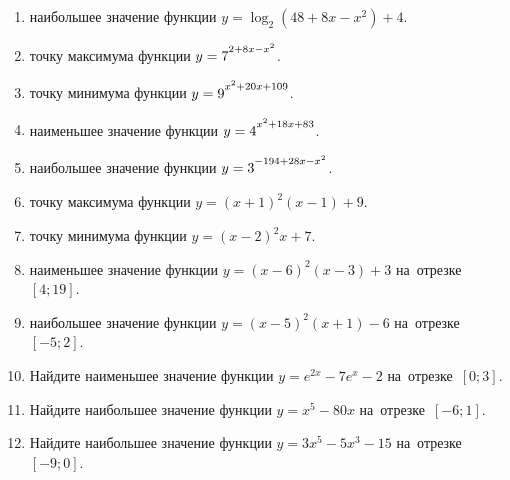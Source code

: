 \documentclass[a4paper,10pt]{article}
\begin{document}
\begin{enumerate}
\item {} наибольшее значение функции $y=\log_2\left(48+8x-x^2\right)+4$.

\item {} точку максимума функции $y=7\strut^{2+8x-x^2}$.

\item {} точку минимума функции $y=9\strut^{x^2+20x+109}$.

\item {} наименьшее значение функции $y=4\strut^{x^2+18x+83}$.

\item {} наибольшее значение функции $y=3\strut^{-194+28x-x^2}$.

\item {} точку максимума функции $y=\left(x+1\right)^2\left(x-1\right)+9$.

\item {} точку минимума функции $y=\left(x-2\right)^2x+7$.

\item {} наименьшее значение функции $y=\left(x-6\right)^2\left(x-3\right)+3$ на~отрезке~$\left[4;19\right]$.

\item {} наибольшее значение функции $y=\left(x-5\right)^2\left(x+1\right)-6$ на~отрезке~$\left[-5;2\right]$.

\item Найдите наименьшее значение функции $y=e^{2x}-7e^x-2$ на~отрезке~$\left[0;3\right]$.

\item Найдите наибольшее значение функции $y=x^5-80x$ на~отрезке~$\left[-6;1\right]$.

\item Найдите наибольшее значение функции $y=3x^5-5x^3-15$ на~отрезке~$\left[-9;0\right]$.

\end{enumerate}
\end{document}
